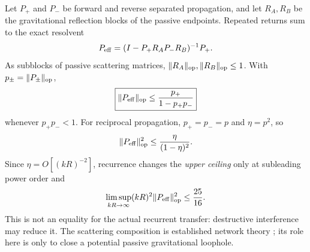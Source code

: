 Let $P_+$ and $P_-$ be forward and reverse separated propagation, and let $R_A,R_B$ be the gravitational reflection blocks of the passive endpoints. Repeated returns sum to the exact resolvent
\begin{equation}
P_{\rm eff}
=(I-P_+R_AP_-R_B)^{-1}P_+ .
\end{equation}
As subblocks of passive scattering matrices, $\|R_A\|_{\mathrm{op}},\|R_B\|_{\mathrm{op}}\le1$. With $p_\pm=\|P_\pm\|_{\mathrm{op}}$,
\begin{equation}
\boxed{
\|P_{\rm eff}\|_{\mathrm{op}}
\le\frac{p_+}{1-p_+p_-}
}
\end{equation}
whenever $p_+p_-<1$. For reciprocal propagation, $p_+=p_-=p$ and $\eta=p^2$, so
\begin{equation}
\|P_{\rm eff}\|_{\mathrm{op}}^2
\le\frac{\eta}{(1-\eta)^2} .
\end{equation}
Since $\eta=O[(kR)^{-2}]$, recurrence changes the \emph{upper ceiling} only at subleading power order and
\begin{equation}
\limsup_{kR\rightarrow\infty}(kR)^2\|P_{\rm eff}\|_{\mathrm{op}}^2\le\frac{25}{16} .
\end{equation}
This is not an equality for the actual recurrent transfer: destructive interference may reduce it. The scattering composition is established network theory \cite{Redheffer1962}; its role here is only to close a potential passive gravitational loophole.
